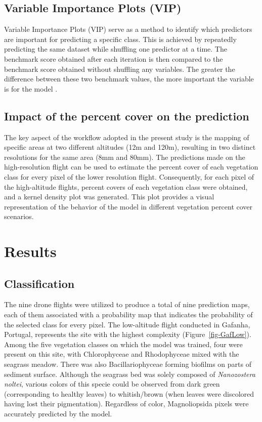 \documentclass[
  number]{elsarticle}
\begin{document}
\subsection{Variable Importance Plots
(VIP)}\label{variable-importance-plots-vip}

Variable Importance Plots (VIP) serve as a method to identify which
predictors are important for predicting a specific class. This is
achieved by repeatedly predicting the same dataset while shuffling one
predictor at a time. The benchmark score obtained after each iteration
is then compared to the benchmark score obtained without shuffling any
variables. The greater the difference between these two benchmark
values, the more important the variable is for the model
\citep{WEI2015399}.

\subsection{Impact of the percent cover on the
prediction}\label{impact-of-the-percent-cover-on-the-prediction}

The key aspect of the workflow adopted in the present study is the
mapping of specific areas at two different altitudes (12m and 120m),
resulting in two distinct resolutions for the same area (8mm and 80mm).
The predictions made on the high-resolution flight can be used to
estimate the percent cover of each vegetation class for every pixel of
the lower resolution flight. Consequently, for each pixel of the
high-altitude flights, percent covers of each vegetation class were
obtained, and a kernel density plot was generated. This plot provides a
visual representation of the behavior of the model in different
vegetation percent cover scenarios.

\section{Results}\label{results}

\subsection{Classification}\label{classification}

The nine drone flights were utilized to produce a total of nine
prediction maps, each of them associated with a probability map that
indicates the probability of the selected class for every pixel. The
low-altitude flight conducted in Gafanha, Portugal, represents the site
with the highest complexity (Figure~\ref{fig-GafLow}). Among the five
vegetation classes on which the model was trained, four were present on
this site, with Chlorophyceae and Rhodophyceae mixed with the seagrass
meadow. There was also Bacillariophyceae forming biofilms on parts of
sediment surface. Although the seagrass bed was solely composed of
\emph{Nanozostera noltei}, various colors of this specie could be
observed from dark green (corresponding to healthy leaves) to
whitish/brown (when leaves were discolored having lost their
pigmentation). Regardless of color, Magnoliopsida pixels were accurately
predicted by the model.
\end{document}
